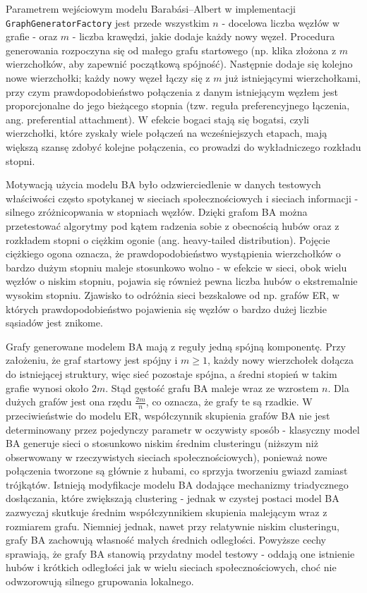 Parametrem wejściowym modelu Barabási--Albert w implementacji \texttt{GraphGeneratorFactory} jest przede wszystkim $n$ - docelowa liczba węzłów w grafie - oraz $m$ - liczba krawędzi, jakie dodaje każdy nowy węzeł. Procedura generowania rozpoczyna się od małego grafu startowego (np. klika złożona z $m$ wierzchołków, aby zapewnić początkową spójność). Następnie dodaje się kolejno nowe wierzchołki; każdy nowy węzeł łączy się z $m$ już istniejącymi wierzchołkami, przy czym prawdopodobieństwo połączenia z danym istniejącym węzłem jest proporcjonalne do jego bieżącego stopnia (tzw. reguła preferencyjnego łączenia, ang. preferential attachment). W efekcie bogaci stają się bogatsi, czyli wierzchołki, które zyskały wiele połączeń na wcześniejszych etapach, mają większą szansę zdobyć kolejne połączenia, co prowadzi do wykładniczego rozkładu stopni.

Motywacją użycia modelu BA było odzwierciedlenie w danych testowych właściwości często spotykanej w sieciach społecznościowych i sieciach informacji - silnego zróżnicopwania w stopniach węzłów. Dzięki grafom BA można przetestować algorytmy pod kątem radzenia sobie z obecnością hubów oraz z rozkładem stopni o ciężkim ogonie (ang. heavy-tailed distribution). Pojęcie ciężkiego ogona oznacza, że prawdopodobieństwo wystąpienia wierzchołków o bardzo dużym stopniu maleje stosunkowo wolno - w efekcie w sieci, obok wielu węzłów o niskim stopniu, pojawia się również pewna liczba hubów o ekstremalnie wysokim stopniu. Zjawisko to odróżnia sieci bezskalowe od np. grafów ER, w których prawdopodobieństwo pojawienia się węzłów o bardzo dużej liczbie sąsiadów jest znikome.

Grafy generowane modelem BA mają z reguły jedną spójną komponentę. Przy założeniu, że graf startowy jest spójny i $m \ge 1$, każdy nowy wierzchołek dołącza do istniejącej struktury, więc sieć pozostaje spójna, a średni stopień w takim grafie wynosi około $2m$. Stąd gęstość grafu BA maleje wraz ze wzrostem $n$. Dla dużych grafów jest ona rzędu $\frac{2m}{n}$, co oznacza, że grafy te są rzadkie. W przeciwieństwie do modelu ER, współczynnik skupienia grafów BA nie jest determinowany przez pojedynczy parametr w oczywisty sposób - klasyczny model BA generuje sieci o stosunkowo niskim średnim clusteringu (niższym niż obserwowany w rzeczywistych sieciach społecznościowych), ponieważ nowe połączenia tworzone są głównie z hubami, co sprzyja tworzeniu gwiazd zamiast trójkątów. Istnieją modyfikacje modelu BA dodające mechanizmy triadycznego dosłączania, które zwiększają clustering - jednak w czystej postaci model BA zazwyczaj skutkuje średnim współczynnikiem skupienia malejącym wraz z rozmiarem grafu. Niemniej jednak, nawet przy relatywnie niskim clusteringu, grafy BA zachowują własność małych średnich odległości. Powyższe cechy sprawiają, że grafy BA stanowią przydatny model testowy - oddają one istnienie hubów i krótkich odległości jak w wielu sieciach społecznościowych, choć nie odwzorowują silnego grupowania lokalnego.

